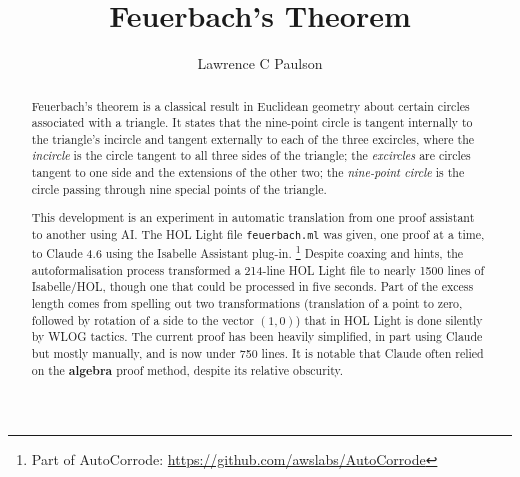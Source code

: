 \documentclass[11pt,a4paper]{article}
\begin{document}
\title{Feuerbach's Theorem}
\author{Lawrence C Paulson}
\maketitle

\begin{abstract}
Feuerbach's theorem is a classical result in Euclidean geometry about certain circles associated with a triangle.
It states that the nine-point circle is tangent internally to the triangle's incircle and tangent externally to each of the three excircles, where
the \emph{incircle} is the circle tangent to all three sides of the triangle;
the \emph{excircles} are circles tangent to one side and the extensions of the other two;
the \emph{nine-point circle} is the circle passing through nine special points of the triangle.

This development is an experiment in automatic translation from one proof assistant to another using AI\@.
The HOL Light file \texttt{feuer\-bach.ml} was given, one proof at a time, 
to Claude 4.6 using the Isabelle Assistant plug-in.%
\footnote{Part of AutoCorrode: \url{https://github.com/awslabs/AutoCorrode}}
%
Despite coaxing and hints, the autoformalisation process transformed a 214-line HOL Light file
to nearly 1500 lines of Isabelle/HOL, though one that could be processed in five seconds.
Part of the excess length comes from spelling out two transformations (translation of a point to zero, 
followed by rotation of a side to the vector $(1,0)$) that in HOL Light is done silently by WLOG tactics.
The current proof has been heavily simplified, in part using Claude but mostly manually, 
and is now under 750 lines. It is notable that Claude often relied on the \textbf{algebra} proof method, 
despite its relative obscurity.
\end{abstract}


\tableofcontents
\newpage


\end{document}

